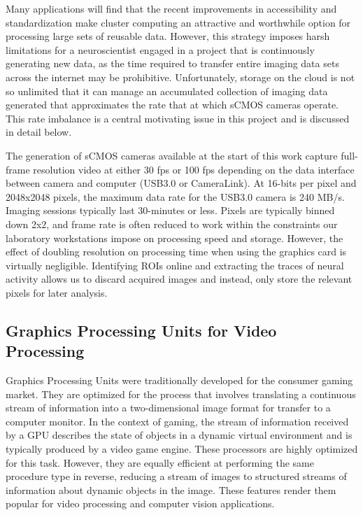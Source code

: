 \documentclass[
  12pt,
]{report}
\numberwithin{figure}{section}
\numberwithin{table}{section}
\numberwithin{equations}{section}
\begin{document}
Many applications will find that the recent improvements in
accessibility and standardization make cluster computing an attractive
and worthwhile option for processing large sets of reusable data.
However, this strategy imposes harsh limitations for a neuroscientist
engaged in a project that is continuously generating new data, as the
time required to transfer entire imaging data sets across the internet
may be prohibitive. Unfortunately, storage on the cloud is not so
unlimited that it can manage an accumulated collection of imaging data
generated that approximates the rate that at which sCMOS cameras
operate. This rate imbalance is a central motivating issue in this
project and is discussed in detail below.

The generation of sCMOS cameras available at the start of this work
capture full-frame resolution video at either 30 fps or 100 fps
depending on the data interface between camera and computer (USB3.0 or
CameraLink). At 16-bits per pixel and 2048x2048 pixels, the maximum data
rate for the USB3.0 camera is 240 MB/s. Imaging sessions typically last
30-minutes or less. Pixels are typically binned down 2x2, and frame rate
is often reduced to work within the constraints our laboratory
workstations impose on processing speed and storage. However, the effect
of doubling resolution on processing time when using the graphics card
is virtually negligible. Identifying ROIs online and extracting the
traces of neural activity allows us to discard acquired images and
instead, only store the relevant pixels for later analysis.

\hypertarget{graphics-processing-units-for-video-processing}{%
\subsection{Graphics Processing Units for Video
Processing}\label{graphics-processing-units-for-video-processing}}

Graphics Processing Units were traditionally developed for the consumer
gaming market. They are optimized for the process that involves
translating a continuous stream of information into a two-dimensional
image format for transfer to a computer monitor. In the context of
gaming, the stream of information received by a GPU describes the state
of objects in a dynamic virtual environment and is typically produced by
a video game engine. These processors are highly optimized for this
task. However, they are equally efficient at performing the same
procedure type in reverse, reducing a stream of images to structured
streams of information about dynamic objects in the image. These
features render them popular for video processing and computer vision
applications.
\end{document}

